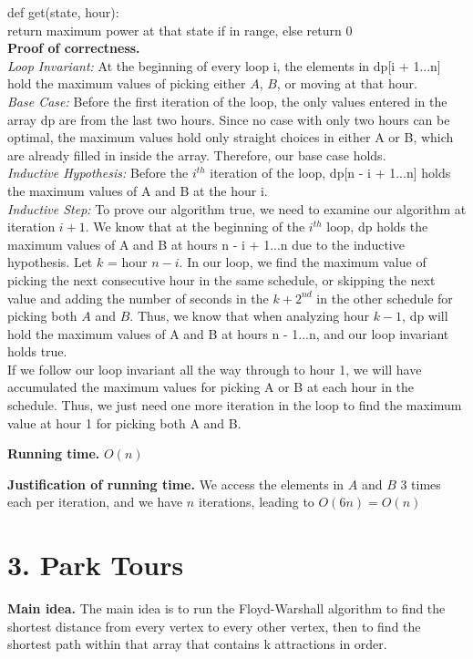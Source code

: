 \documentclass[11pt]{article}
\begin{document}
\noindent def get(state, hour): \\
\indent return maximum power at that state if in range, else return 0 \\
\noindent
\textbf{Proof of correctness.}\\
\textit{Loop Invariant:} At the beginning of every loop i, the elements in dp[i + 1...n] hold the maximum values of picking either $A$, $B$, or moving at that hour.  \\
\textit{Base Case:} Before the first iteration of the loop, the only values entered in the array dp are from the last two hours.  Since no case with only two hours can be optimal, the maximum values hold only straight choices in either A or B, which are already filled in inside the array.  Therefore, our base case holds. \\
\textit{Inductive Hypothesis:} Before the $i^{th}$ iteration of the loop, dp[n - i + 1...n] holds the maximum values of A and B at the hour i. \\
\textit{Inductive Step:} To prove our algorithm true, we need to examine our algorithm at iteration $i + 1$.  We know that at the beginning of the $i^{th}$ loop, dp holds the maximum values of A and B at hours n - i + 1...n due to the inductive hypothesis.  Let $k$ = hour $n - i$.  In our loop, we find the maximum value of picking the next consecutive hour in the same schedule, or skipping the next value and adding the number of seconds in the $k+2^{nd}$ in the other schedule for picking both $A$ and $B$.  Thus, we know that when analyzing hour $k - 1$, dp will hold the maximum values of A and B at hours n - 1...n, and our loop invariant holds true. \\

\noindent If we follow our loop invariant all the way through to hour 1, we will have accumulated the maximum values for picking A or B at each hour in the schedule.  Thus, we just need one more iteration in the loop to find the maximum value at hour 1 for picking both A and B.

\noindent
\textbf{Running time.}
$O(n)$


\noindent
\textbf{Justification of running time.}
We access the elements in $A$ and $B$ 3 times each per iteration, and we have $n$ iterations, leading to $O(6n) = O(n)$



\newpage
\section*{3. Park Tours}
\noindent
\textbf{Main idea.}
The main idea is to run the Floyd-Warshall algorithm to find the shortest distance from every vertex to every other vertex, then to find the shortest path within that array that contains k attractions in order.
\end{document}
